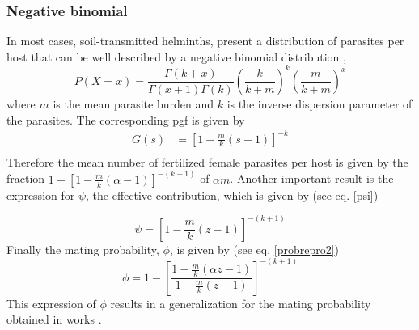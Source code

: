\documentclass[12pt,a4paper]{article}
\theoremstyle{plain}%
\theoremstyle{definition}
\theoremstyle{remark}
\begin{document}
	
	
	\subsubsection{Negative binomial}
	In most cases, soil-transmitted helminths, present a distribution of parasites per host that can be well described by a negative binomial distribution \citep{bundy1987epidemiology,hoagland1978necator,seo1979frequency},
	\begin{equation}
	P(X=x)=\frac{\Gamma(k+x)}{\Gamma(x+1)\Gamma(k)}\left( \frac{k}{k+m}\right) ^k \left( \frac{m}{k+m}\right) ^x
	\end{equation}
	where $m$ is the mean parasite burden and $k$ is the inverse dispersion parameter of the parasites. The corresponding pgf is given by
	\begin{equation}
	\begin{split}
	G(s)&=\left[ 1-\frac{m}{k}(s-1)\right] ^{-k}\\
	\end{split}
	\end{equation}
	Therefore the mean number of fertilized female parasites per host is given by the fraction
	$ 1-\left[ 1-\frac{m}{k}(\alpha-1)\right] ^{-(k+1)} $  of $\alpha m$. 
	Another important result is the expression for $\psi$, the effective contribution, which is given by (see eq. \eqref{psi})
	
	\begin{equation}\label{phibn}
	\psi=	 \left[ 1-\frac{m}{k}(z-1)\right] ^{-(k+1)} 
	\end{equation}     
	Finally the mating probability, $\phi$, is given by (see eq. \eqref{probrepro2})
	\begin{equation} 
	\phi=
	1-\left[ \frac{ 1-\frac{m}{k}(\alpha z-1)}{1-\frac{m}{k}(z-1) }\right]  ^{-(k+1)} 
	\end{equation}
	This expression of $\phi$ results in a generalization for the mating probability obtained in works  \cite{anderson1992infectious,may1993biased,may1977togetherness}.
		
\end{document}
